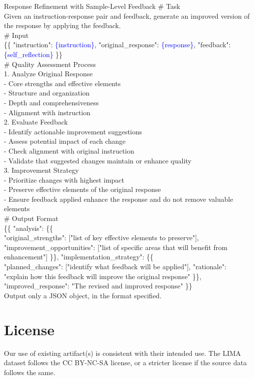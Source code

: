 \begin{promptbox}{Response Refinement with Sample-Level Feedback}
\# Task \\
Given an instruction-response pair and feedback, generate an improved version of the response by applying the feedback. \\

\# Input \\
\{\{
  "instruction": \textcolor{blue}{\{instruction\}},
  "original\_response": \textcolor{blue}{\{response\}},
  "feedback": \textcolor{blue}{\{self\_reflection\}}
\}\} \\

\# Quality Assessment Process \\
1. Analyze Original Response \\
- Core strengths and effective elements \\
- Structure and organization \\
- Depth and comprehensiveness \\
- Alignment with instruction \\

2. Evaluate Feedback \\
- Identify actionable improvement suggestions \\
- Assess potential impact of each change \\
- Check alignment with original instruction \\
- Validate that suggested changes maintain or enhance quality \\

3. Improvement Strategy \\
- Prioritize changes with highest impact \\
- Preserve effective elements of the original response \\
- Ensure feedback applied enhance the response and do not remove valuable elements \\

\# Output Format \\
\{\{
    "analysis": \{\{ \\
        "original\_strengths": ["list of key effective elements to preserve"],
        "improvement\_opportunities": ["list of specific areas that will benefit from enhancement"]
    \}\},
    "implementation\_strategy": \{\{ \\
        "planned\_changes": ["identify what feedback will be applied"],
        "rationale": "explain how this feedback will improve the original response"
    \}\},
    "improved\_response": "The revised and improved response"
\}\} \\

Output only a JSON object, in the format specified.
\end{promptbox}

\section{License}
Our use of existing artifact(s) is consistent with their intended use. The LIMA dataset follows the CC BY-NC-SA license, or a stricter license if the source data follows the same.